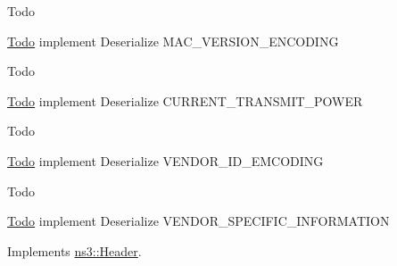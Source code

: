 \begin{DoxyRefDesc}{Todo}
\item[\hyperlink{todo__todo000186}{Todo}]implement Deserialize M\+A\+C\+\_\+\+V\+E\+R\+S\+I\+O\+N\+\_\+\+E\+N\+C\+O\+D\+I\+NG \end{DoxyRefDesc}


\begin{DoxyRefDesc}{Todo}
\item[\hyperlink{todo__todo000187}{Todo}]implement Deserialize C\+U\+R\+R\+E\+N\+T\+\_\+\+T\+R\+A\+N\+S\+M\+I\+T\+\_\+\+P\+O\+W\+ER \end{DoxyRefDesc}


\begin{DoxyRefDesc}{Todo}
\item[\hyperlink{todo__todo000188}{Todo}]implement Deserialize V\+E\+N\+D\+O\+R\+\_\+\+I\+D\+\_\+\+E\+M\+C\+O\+D\+I\+NG \end{DoxyRefDesc}


\begin{DoxyRefDesc}{Todo}
\item[\hyperlink{todo__todo000189}{Todo}]implement Deserialize V\+E\+N\+D\+O\+R\+\_\+\+S\+P\+E\+C\+I\+F\+I\+C\+\_\+\+I\+N\+F\+O\+R\+M\+A\+T\+I\+ON \end{DoxyRefDesc}


Implements \hyperlink{classns3_1_1Header_a78be9400bb66b2a8543606f395ef5396}{ns3\+::\+Header}.


